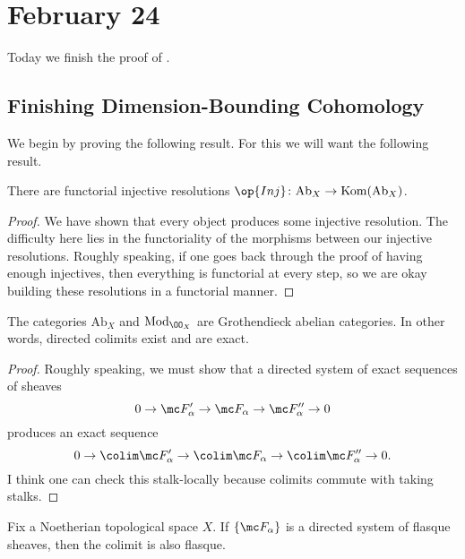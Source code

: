 \documentclass[../notes.tex]{subfiles}
\begin{document}
\section{February 24}

Today we finish the proof of .

\subsection{Finishing Dimension-Bounding Cohomology}
We begin by proving the following result.
\cohomcolimit*
\noindent For this we will want the following result.
\begin{lemma}
	There are functorial injective resolutions $\op{Inj}\colon\mathrm{Ab}_X\to\mathrm{Kom}(\mathrm{Ab}_X)$.
\end{lemma}
\begin{proof}
	We have shown that every object produces some injective resolution. The difficulty here lies in the functoriality of the morphisms between our injective resolutions. Roughly speaking, if one goes back through the proof of having enough injectives, then everything is functorial at every step, so we are okay building these resolutions in a functorial manner.
\end{proof}
\begin{lemma}
	The categories $\mathrm{Ab}_X$ and $\mathrm{Mod}_{\OO_X}$ are Grothendieck abelian categories. In other words, directed colimits exist and are exact.
\end{lemma}
\begin{proof}
	Roughly speaking, we must show that a directed system of exact sequences of sheaves
	\[0\to\mc F_\alpha'\to\mc F_\alpha\to\mc F''_\alpha\to0\]
	produces an exact sequence
	\[0\to\colim\mc F'_\alpha\to\colim \mc F_\alpha\to\colim\mc F''_\alpha\to0.\]
	I think one can check this stalk-locally because colimits commute with taking stalks.
\end{proof}
\begin{lemma}
	Fix a Noetherian topological space $X$. If $\{\mc F_\alpha\}$ is a directed system of flasque sheaves, then the colimit is also flasque.
\end{lemma}
\end{document}
